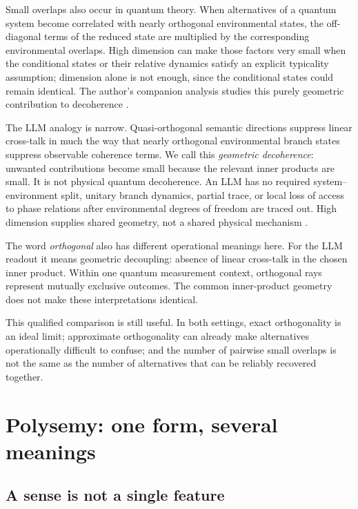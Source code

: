\documentclass[
  aps,
  reprint,
  superscriptaddress,
  floatfix,
  nofootinbib,
  longbibliography
]{revtex4-2}
\begin{document}
Small overlaps also occur in quantum theory.  When alternatives of a quantum
system become correlated with nearly orthogonal environmental states, the
off-diagonal terms of the reduced state are multiplied by the corresponding
environmental overlaps.  High dimension can make those factors very small
when the conditional states or their relative dynamics satisfy an explicit
typicality assumption; dimension alone is not enough, since the conditional
states could remain identical.  The author's companion analysis studies this
purely geometric contribution to decoherence
\cite{svozil2026geometricdecoherence}.

The LLM analogy is narrow.  Quasi-orthogonal semantic directions suppress
linear cross-talk in much the way that nearly orthogonal environmental branch
states suppress observable coherence terms.  We call this \emph{geometric
decoherence}: unwanted contributions become small because the relevant inner
products are small.  It is not physical quantum decoherence.  An LLM has no
required system--environment split, unitary branch dynamics, partial trace,
or local loss of access to phase relations after environmental degrees of
freedom are traced out.  High dimension supplies shared geometry, not a
shared physical mechanism
\cite{RevModPhys.75.715}.

The word \emph{orthogonal} also has different operational meanings here.  For
the LLM readout it means geometric decoupling: absence of linear cross-talk in
the chosen inner product.  Within one quantum measurement
context, orthogonal rays represent
mutually exclusive outcomes.  The common inner-product geometry does not make
these interpretations identical.

This qualified comparison is still useful.  In both settings, exact
orthogonality is an ideal limit; approximate orthogonality can already make
alternatives operationally difficult to confuse; and the number of pairwise
small overlaps is not the same as the number of alternatives that can be
reliably recovered together.

\section{Polysemy: one form, several meanings}
\label{sec:polysemy}

\subsection{A sense is not a single feature}
\end{document}
